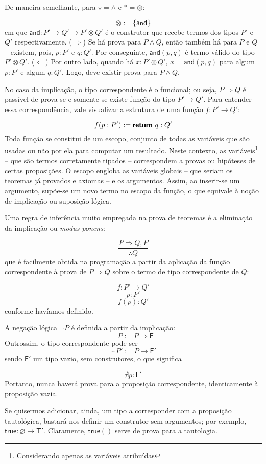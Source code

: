 De maneira semelhante, para $\star = \wedge$ e $\ast = \otimes$:

$$\otimes := \{ \textsf{and} \}$$ em que $\textsf{and} : P' \to Q' \to P' \otimes Q'$ é o construtor que recebe termos dos tipos $P'$ e $Q'$ respectivamente. ($\Rightarrow$) Se há prova para $P \wedge Q$, então também há para $P$ e $Q$ -- existem, pois, $p:P'$ e $q:Q'$. Por conseguinte, $\textsf{and} (p, q)$ é termo válido do tipo $P' \otimes Q'$. ($\Leftarrow$) Por outro lado, quando há $x:P' \otimes Q'$, $x = \textsf{and} (p, q)$ para algum $p:P'$ e algum $q:Q'$. Logo, deve existir prova para $P \wedge Q$.

No caso da implicação, o tipo correspondente é o funcional; ou seja, $P \Rightarrow Q$ é passível de prova se e somente se existe função do tipo $P' \to Q'$. Para entender essa correspondência, vale visualizar a estrutura de uma função $f:P' \to Q'$:

$$f (p:P') := \textsf{\textbf{return} } q:Q'$$ Toda função se constitui de um escopo, conjunto de todas as variáveis que são usadas ou não por ela para computar um resultado. Neste contexto, as variáveis\footnote{Considerando apenas as variáveis atribuídas} -- que são termos corretamente tipados -- correspondem a provas ou hipóteses de certas proposições. O escopo engloba as variáveis globais -- que seriam os teoremas já provados e axiomas -- e os argumentos. Assim, ao inserir-se um argumento, supõe-se um novo termo no escopo da função, o que equivale à noção de implicação ou suposição lógica.

Uma regra de inferência muito empregada na prova de teoremas é a eliminação da implicação ou \textit{modus ponens}:

$$\frac{P \Rightarrow Q, P}{\therefore Q}$$ que é facilmente obtida na programação a partir da aplicação da função correspondente à prova de $P \Rightarrow Q$ sobre o termo de tipo correspondente de $Q$:

$$f:P' \to Q'$$ $$p:P'$$ $$f(p):Q'$$ conforme havíamos definido.

A negação lógica $\lnot P$ é definida a partir da implicação: $$\lnot P := P \Rightarrow \textsf{F}$$ Outrossim, o tipo correspondente pode ser $$\sim P' := P \to \textsf{F}'$$ sendo $\textsf{F}'$ um tipo vazio, sem construtores, o que significa

$$\nexists p : \textsf{F}'$$ Portanto, nunca haverá prova para a proposição correspondente, identicamente à proposição vazia.

Se quisermos adicionar, ainda, um tipo a corresponder com a proposição tautológica, bastará-nos definir um construtor sem argumentos; por exemplo, $\textsf{true}: \varnothing \to \textsf{T}'$. Claramente, $\textsf{true}()$ serve de prova para a tautologia.

